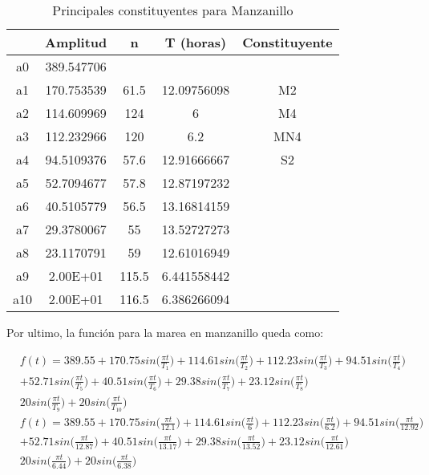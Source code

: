 \documentclass[12pt,letterpaper]{article}
\begin{document}
\begin{table}[H]
\centering
\begin{tabular}{|c|c c c c |}
\hline
	&	Amplitud	&	n	&	T (horas)	&	Constituyente	\\
    \hline
a0	&	389.547706	&		&		&		\\
a1	&	170.753539	&	61.5	&	12.09756098	&	M2	\\
a2	&	114.609969	&	124	&	6	&	M4	\\
a3	&	112.232966	&	120	&	6.2	&	MN4	\\
a4	&	94.5109376	&	57.6	&	12.91666667	&	S2	\\
a5	&	52.7094677	&	57.8	&	12.87197232	&		\\
a6	&	40.5105779	&	56.5	&	13.16814159	&		\\
a7	&	29.3780067	&	55	&	13.52727273	&		\\
a8	&	23.1170791	&	59	&	12.61016949	&		\\
a9	&	2.00E+01	&	115.5	&	6.441558442	&		\\
a10	&	2.00E+01	&	116.5	&	6.386266094	&		\\
									

\hline
\end{tabular}
\caption{Principales constituyentes para Manzanillo}
\end{table}

Por ultimo, la función para la marea en manzanillo queda como:

\begin{equation}
 \begin{split}
& f(t) = 389.55 + 170.75sin\bigg(\frac{\pi t}{T_1}\bigg) + 114.61sin\bigg(\frac{\pi t}{T_2}\bigg) + 112.23sin\bigg(\frac{\pi t}{T_3}\bigg) + 94.51sin\bigg(\frac{\pi t}{T_4}\bigg) \\
& + 52.71sin\bigg(\frac{\pi t}{T_5}\bigg) + 40.51sin\bigg(\frac{\pi t}{T_6}\bigg) + 29.38sin\bigg(\frac{\pi t}{T_7}\bigg) + 23.12sin\bigg(\frac{\pi t}{T_8}\bigg)  \\
& 20sin\bigg(\frac{\pi t}{T_9}\bigg) + 
20sin\bigg(\frac{\pi t}{T_10}\bigg) \\
& f(t) = 389.55 + 170.75sin\bigg(\frac{\pi t}{12.1}\bigg) + 114.61sin\bigg(\frac{\pi t}{6}\bigg) + 112.23sin\bigg(\frac{\pi t}{6.2}\bigg) + 94.51sin\bigg(\frac{\pi t}{12.92}\bigg) \\
& + 52.71sin\bigg(\frac{\pi t}{12.87}\bigg) + 40.51sin\bigg(\frac{\pi t}{13.17}\bigg) + 29.38sin\bigg(\frac{\pi t}{13.52}\bigg) + 23.12sin\bigg(\frac{\pi t}{12.61}\bigg)  \\
& 20sin\bigg(\frac{\pi t}{6.44}\bigg) + 
20sin\bigg(\frac{\pi t}{6.38}\bigg) \\
\end{split}
\end{equation}
\end{document}
